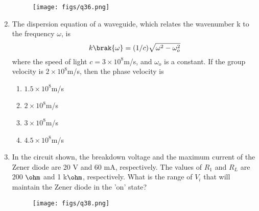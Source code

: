 \documentclass[a4paper, 11pt]{article}
\begin{document}
\begin{enumerate}
    \begin{figure}[H]
        \centering
        \texttt{[image: figs/q36.png]}
        \caption*{}
        \label{fig:q36}
    \end{figure}
    
    \begin{enumerate}
    \end{enumerate}
    
    \hfill{}
    
    \item The dispersion equation of a waveguide, which relates the wavenumber k to the frequency $\omega$, is
    \[
    k\brak{\omega}=(1/c)\sqrt{\omega^{2}-\omega_{o}^{2}}
    \]
    where the speed of light $c=3\times10^{8}$m/s, and $\omega_{o}$ is a constant. If the group velocity is $2\times10^{8}$m/s, then the phase velocity is
    
    \begin{enumerate}
        \item $1.5\times10^{8}$m/s
        \item $2\times10^{8}$m/s
        \item $3\times10^{8}$m/s
        \item $4.5\times10^{8}$m/s
    \end{enumerate}

    \hfill{}
    
    \item In the circuit shown, the breakdown voltage and the maximum current of the Zener diode are 20 V and 60 mA, respectively. The values of $R_{1}$ and $R_{L}$ are 200 $\ohm$ and 1 k$\ohm$, respectively. What is the range of $V_{i}$ that will maintain the Zener diode in the 'on' state?
    
    \begin{figure}[H]
        \centering
        \texttt{[image: figs/q38.png]}
        \caption*{}
        \label{fig:q38}
    \end{figure}
    

\end{enumerate}
\end{document}
